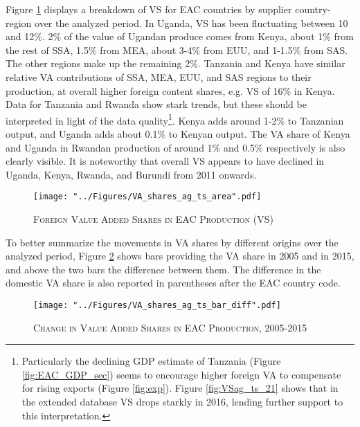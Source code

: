 \documentclass[a4paper]{article}
\begin{document}
Figure \ref{fig:EACVB_ts} displays a breakdown of VS for EAC countries by supplier country-region over the analyzed period. In Uganda, VS has been fluctuating between 10 and 12\%. 2\% of the value of Ugandan produce comes from Kenya, about 1\% from the rest of SSA, 1.5\% from MEA, about 3-4\% from EUU, and 1-1.5\% from SAS. The other regions make up the remaining 2\%. Tanzania and Kenya have similar relative VA contributions of SSA, MEA, EUU, and SAS regions to their production, at overall higher foreign content shares, e.g. VS of 16\% in Kenya. Data for Tanzania and Rwanda show stark trends, but these should be interpreted in light of the data quality\footnote{Particularly the declining GDP estimate of Tanzania (Figure \ref{fig:EAC_GDP_sec}) seems to encourage higher foreign VA to compensate for rising exports (Figure \ref{fig:exp}). Figure \ref{fig:VSag_ts_21} shows that in the extended database VS drops starkly in 2016, lending further support to this interpretation.}. Kenya adds around 1-2\% to Tanzanian output, and Uganda adds about 0.1\% to Kenyan output. The VA share of Kenya and Uganda in Rwandan production of around 1\% and 0.5\% respectively is also clearly visible. It is noteworthy that overall VS appears to have declined in Uganda, Kenya, Rwanda, and Burundi from 2011 onwards. 

\begin{figure}[h!]
\centering
\caption{\label{fig:EACVB_ts}\textsc{Foreign Value Added Shares in EAC Production (VS)}}
\texttt{[image: "../Figures/VA\_shares\_ag\_ts\_area".pdf]} %
\vspace{-0.5cm}
\end{figure}
\FloatBarrier

To better summarize the movements in VA shares by different origins over the analyzed period, Figure \ref{fig:EACVB_ts_bar} shows bars providing the VA share in 2005 and in 2015, and above the two bars the difference between them. The difference in the domestic VA share is also reported in parentheses after the EAC country code.

\begin{figure}[h!]
\centering
\caption{\label{fig:EACVB_ts_bar}\textsc{Change in Value Added Shares in EAC Production, 2005-2015}}
\texttt{[image: "../Figures/VA\_shares\_ag\_ts\_bar\_diff".pdf]} %
\vspace{-1.5cm}
\end{figure}
\FloatBarrier
\end{document}
